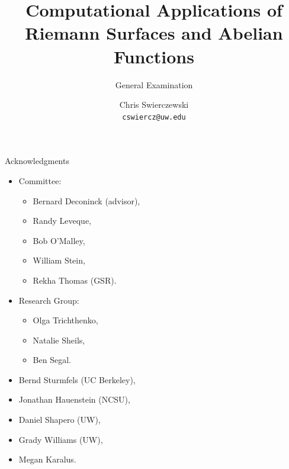 \documentclass{beamer}
\title{Computational Applications of Riemann Surfaces and Abelian Functions}
\subtitle{General Examination}
\author{
  Chris Swierczewski\\
  {\tt cswiercz@uw.edu}
}
\institute{
  Department of Applied Mathematics\\
  University of Washington\\
  Seattle, Washington
}
\begin{document}



\begin{frame}
  \titlepage
\end{frame}






\begin{frame}{Acknowledgments}{}
  \begin{itemize}
    \item Committee:
      \begin{itemize}
          \item Bernard Deconinck (advisor),
          \item Randy Leveque,
          \item Bob O'Malley,
          \item William Stein,
          \item Rekha Thomas (GSR).
      \end{itemize}
    \item Research Group:
      \begin{itemize}
        \item Olga Trichthenko,
        \item Natalie Sheils,
        \item Ben Segal.
      \end{itemize}
    \item Bernd Sturmfels (UC Berkeley),
    \item Jonathan Hauenstein (NCSU),
    \item Daniel Shapero (UW),
    \item Grady Williams (UW),
    \item Megan Karalus.
  \end{itemize}
\end{frame}
\end{document}
